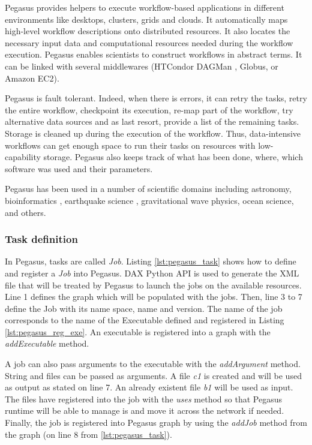 Pegasus provides helpers to execute workflow-based applications in different environments like desktops, clusters, grids and clouds.
It automatically maps high-level workflow descriptions onto distributed resources.
It also locates the necessary input data and computational resources needed during the workflow execution.
Pegasus enables scientists to construct workflows in abstract terms.
It can be linked with several middlewares (HTCondor DAGMan \cite{ThaTL2002}, Globus, or Amazon EC2).

Pegasus is fault tolerant.
Indeed, when there is errors, it can retry the tasks, retry the entire workflow, checkpoint its execution, re-map part of the workflow, try alternative data sources and as last resort, provide a list of the remaining tasks.
Storage is cleaned up during the execution of the workflow.
Thus, data-intensive workflows can get enough space to run their tasks on resources with low-capability storage.
Pegasus also keeps track of what has been done, where, which software was used and their parameters.

Pegasus has been used in a number of scientific domains including astronomy, bioinformatics \cite{PRBBF2016}, earthquake science , gravitational wave physics, ocean science, and others.

\subsubsection{Task definition}
In Pegasus, tasks are called \textit{Job}.
Listing \ref{lst:pegasus_task} shows how to define and register a \textit{Job} into Pegasus.
DAX Python API is used to generate the XML file that will be treated by Pegasus to launch the jobs on the available resources.
Line 1 defines the graph which will be populated with the jobs.
Then, line 3 to 7 define the Job with its name space, name and version.
The name of the job corresponds to the name of the Executable defined and registered in Listing \ref{lst:pegasus_reg_exe}.
An executable is registered into a graph with the \textit{addExecutable} method.

\begin{figure}[h]

\end{figure}

A job can also pass arguments to the executable with the \textit{addArgument} method.
String and files can be passed as arguments.
A file \textit{c1} is created and will be used as output as stated on line 7.
An already existent file \textit{b1} will be used as input.
The files have registered into the job with the \textit{uses} method so that Pegasus runtime will be able to manage is and move it across the network if needed.
Finally, the job is registered into Pegasus graph by using the \textit{addJob} method from the graph (on line 8 from \ref{lst:pegasus_task}).

